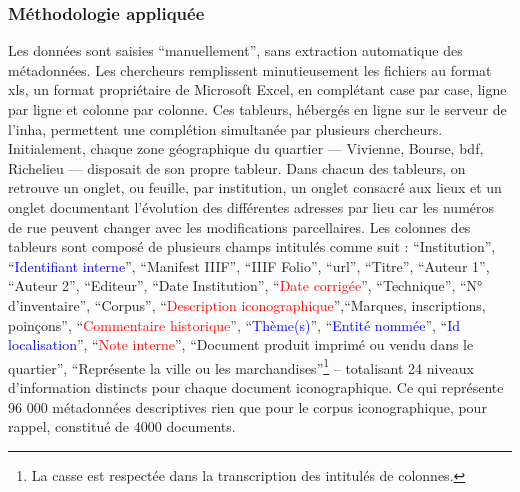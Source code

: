 \subsubsection{Méthodologie appliquée}
Les données sont saisies \enquote{manuellement}, sans extraction automatique des métadonnées. Les chercheurs remplissent minutieusement les fichiers au format xls, un format propriétaire de Microsoft Excel, en complétant case par case, ligne par ligne et colonne par colonne. Ces tableurs, hébergés en ligne sur le serveur de l'\acrshort{inha}, permettent une complétion simultanée par plusieurs chercheurs. Initialement, chaque zone géographique du quartier — Vivienne, Bourse, \acrlong{bdf}, Richelieu — disposait de son propre tableur. Dans chacun des tableurs, on retrouve un onglet, ou feuille, par institution, un onglet consacré aux lieux et un onglet documentant l'évolution des différentes adresses par lieu car les numéros de rue peuvent changer avec les modifications parcellaires. Les colonnes des tableurs sont composé de plusieurs champs intitulés comme suit :  \enquote{Institution}, \enquote{\textcolor{blue}{Identifiant interne}}, \enquote{Manifest IIIF}, \enquote{IIIF Folio}, \enquote{\acrshort{url}}, \enquote{Titre}, \enquote{Auteur 1}, \enquote{Auteur 2}, \enquote{Editeur}, \enquote{Date Institution}, \enquote{\textcolor{red}{{Date corrigée}}}, \enquote{Technique}, \enquote{N° d'inventaire}, \enquote{Corpus}, \enquote{\textcolor{red}{Description iconographique}},\enquote{Marques, inscriptions, poinçons}, \enquote{\textcolor{red}{Commentaire historique}}, \enquote{\textcolor{blue}{Thème(s)}}, \enquote{\textcolor{blue}{Entité nommée}}, {\enquote{\textcolor{blue}{Id localisation}}}, \enquote{\textcolor{red}{Note interne}}, \enquote{Document produit imprimé ou vendu dans le quartier}, \enquote{Représente la ville ou les marchandises}\footnote{La casse est respectée dans la transcription des intitulés de colonnes.} -- totalisant 24 niveaux d’information distincts pour chaque document iconographique. Ce qui représente 96 000 métadonnées descriptives rien que pour le corpus iconographique, pour rappel, constitué de 4000 documents. 

